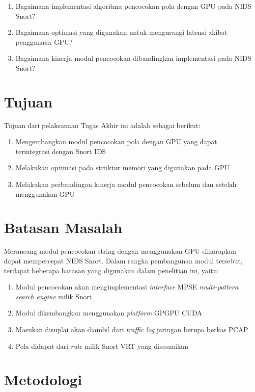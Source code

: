   \begin{enumerate}
      \item Bagaimana implementasi algoritma pencocokan pola dengan GPU pada NIDS Snort?
      \item Bagaimana optimasi yang digunakan untuk mengurangi latensi akibat penggunaan GPU?
      \item Bagaimana kinerja modul pencocokan dibandingkan implementasi pada NIDS Snort?
  \end{enumerate}

\section{Tujuan}

  Tujuan dari pelaksanaan Tugas Akhir ini adalah sebagai berikut:
  \begin{enumerate}
      \item Mengembangkan modul pencocokan pola dengan GPU yang dapat terintegrasi dengan Snort IDS
      \item Melakukan optimasi pada struktur memori yang digunakan pada GPU
      \item Melakukan perbandingan kinerja modul pencocokan sebelum dan setelah menggunakan GPU
  \end{enumerate}

\section{Batasan Masalah}

  Merancang modul pencocokan string dengan menggunakan GPU diharapkan dapat mempercepat NIDS Snort. Dalam rangka pembangunan modul tersebut, terdapat beberapa batasan yang digunakan dalam penelitian ini, yaitu:
  \begin{enumerate}
      \item Modul pencocokan akan mengimplementasi \emph{interface} MPSE \emph{multi-pattern search engine} milik Snort
      \item Modul dikembangkan menggunakan \emph{platform} GPGPU CUDA
      \item Masukan disuplai akan diambil dari \emph{traffic log} jaringan berupa berkas PCAP
      \item Pola didapat dari \emph{rule} milik Snort VRT yang disesuaikan
  \end{enumerate}

\section{Metodologi}

